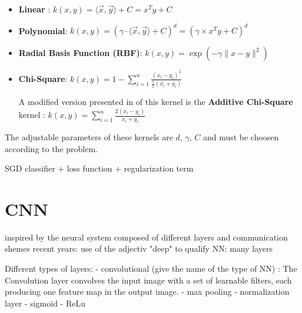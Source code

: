 \begin{itemize}
    \item \textbf{Linear} : $k(x, y) = \langle \vec{x} , \vec{y} \rangle + C = x^T y + C$
    \item \textbf{Polynomial}: $k(x, y) = (\gamma \cdot \langle \vec{x} , \vec{y} \rangle + C)^d = (\gamma \times x^T y + C)^d$
    \item \textbf{Radial Basis Function (RBF)}: $k(x, y) = \exp \left( - \gamma \lVert x - y \rVert ^2 \right)$
    \item \textbf{Chi-Square}: $\displaystyle k(x, y) = 1 - \sum_{i=1}^n \frac{(x_i-y_i)^2}{\frac{1}{2} (x_i+y_i)}$
    
    A modified version presented in \cite{Vedaldi2010} of this kernel is the \textbf{Additive Chi-Square} kernel :
    $\displaystyle k(x, y) = \sum_{i=1}^n \frac{2 (x_i - y_i)}{x_i + y_i} $
\end{itemize}

The adjustable parameters of these kernels are $d$, $\gamma$, $C$ and must be choosen according to the problem.

SGD classifier + loss function + regularization term%

\section{CNN}

inspired by the neural system composed of different layers and communication shemes
recent years: use of the adjectiv "deep" to qualify NN: many layers

Different types of layers:
- convolutional (give the name of the type of NN) : The Convolution layer convolves the input image with a set of learnable filters, each producing one feature map in the output image.
- max pooling
- normalization layer %
- sigmoid
- ReLu